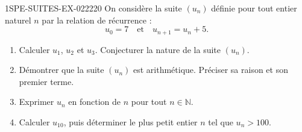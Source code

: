 \begin{exercice}{1SPE-SUITES-EX-022}{2}{20}
On considère la suite $(u_n)$ définie pour tout entier naturel $n$ par la relation de récurrence :
\[
  u_0 = 7 \quad \text{et} \quad u_{n+1} = u_n + 5.
\]

\begin{enumerate}
  \item Calculer $u_1$, $u_2$ et $u_3$. Conjecturer la nature de la suite $(u_n)$.

  \item Démontrer que la suite $(u_n)$ est arithmétique. Préciser sa raison et son premier terme.

  \item Exprimer $u_n$ en fonction de $n$ pour tout $n \in \mathbb{N}$.

  \item Calculer $u_{10}$, puis déterminer le plus petit entier $n$ tel que $u_n > 100$.
\end{enumerate}
\end{exercice}
